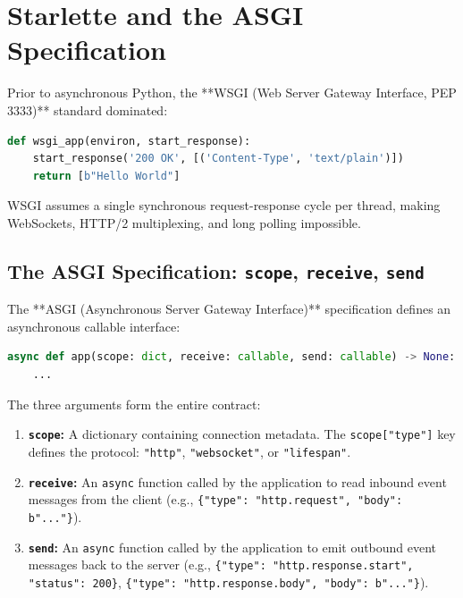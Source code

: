 \section{Starlette and the ASGI Specification}

Prior to asynchronous Python, the **WSGI (Web Server Gateway Interface, PEP 3333)** standard dominated:
\begin{lstlisting}[language=Python]
def wsgi_app(environ, start_response):
    start_response('200 OK', [('Content-Type', 'text/plain')])
    return [b"Hello World"]
\end{lstlisting}
WSGI assumes a single synchronous request-response cycle per thread, making WebSockets, HTTP/2 multiplexing, and long polling impossible.

\subsection{The ASGI Specification: \texttt{scope}, \texttt{receive}, \texttt{send}}

The **ASGI (Asynchronous Server Gateway Interface)** specification defines an asynchronous callable interface:

\begin{lstlisting}[language=Python,caption={The Pure ASGI 3.0 Application Signature}]
async def app(scope: dict, receive: callable, send: callable) -> None:
    ...
\end{lstlisting}

The three arguments form the entire contract:
\begin{enumerate}[leftmargin=15pt]
  \item \textbf{\texttt{scope}:} A dictionary containing connection metadata. The \texttt{scope["type"]} key defines the protocol: \texttt{"http"}, \texttt{"websocket"}, or \texttt{"lifespan"}.
  \item \textbf{\texttt{receive}:} An \texttt{async} function called by the application to read inbound event messages from the client (e.g., \texttt{\{"type": "http.request", "body": b"..."\}}).
  \item \textbf{\texttt{send}:} An \texttt{async} function called by the application to emit outbound event messages back to the server (e.g., \texttt{\{"type": "http.response.start", "status": 200\}}, \texttt{\{"type": "http.response.body", "body": b"..."\}}).
\end{enumerate}

